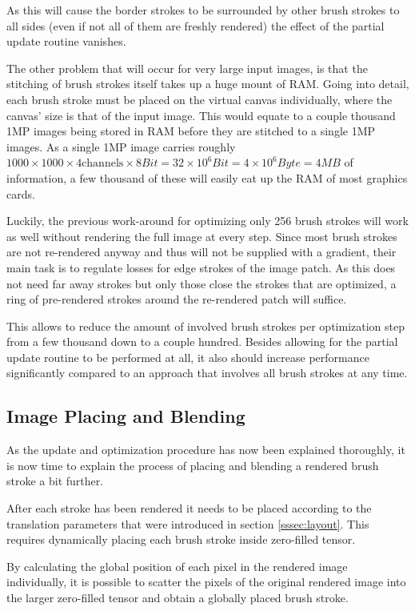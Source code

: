 As this will cause the border strokes to be surrounded by other brush strokes to all
sides (even if not all of them are freshly rendered) the effect of the partial update
routine vanishes.

The other problem that will occur for very large input images, is that the stitching
of brush strokes itself takes up a huge mount of RAM.
Going into detail, each brush stroke must be placed on the virtual canvas individually, 
where the canvas' size is that of the input image.
This would equate to a couple thousand 1MP images being stored in RAM before they
are stitched to a single 1MP images.
As a single 1MP image carries roughly $1000 \times 1000 \times 4 \text{channels}
\times 8 Bit = 32 \times 10^{6} Bit = 4 \times 10^{6} Byte = 4 MB$ of information,
a few thousand of these will easily eat up the RAM of most graphics cards.

Luckily, the previous work-around for optimizing only 256 brush strokes will work
as well without rendering the full image at every step.
Since most brush strokes are not re-rendered anyway and thus will not be supplied with
a gradient, their main task is to regulate losses for edge strokes of the image patch.
As this does not need far away strokes but only those close the strokes that are
optimized, a ring of pre-rendered strokes around the re-rendered patch will suffice.

This allows to reduce the amount of involved brush strokes per optimization step
from a few thousand down to a couple hundred.
Besides allowing for the partial update routine to be performed at all, it also
should increase performance significantly compared to an approach that involves
all brush strokes at any time.

\subsection{Image Placing and Blending}
As the update and optimization procedure has now been explained thoroughly, it is
now time to explain the process of placing and blending a rendered brush stroke a
bit further.

After each stroke has been rendered it needs to be placed according to the translation
parameters that were introduced in section \ref{sssec:layout}.
This requires dynamically placing each brush stroke inside zero-filled tensor.

By calculating the global position of each pixel in the rendered image individually,
it is possible to scatter the pixels of the original rendered image into the larger
zero-filled tensor and obtain a globally placed brush stroke.

